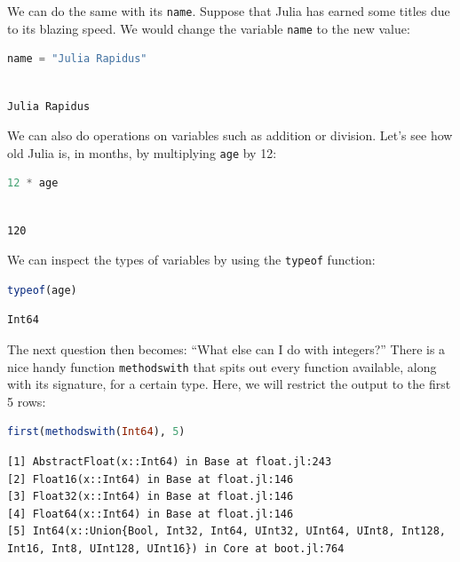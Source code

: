 \documentclass[
  notoc %
]{tufte-book}
\newcommand{\passthrough}[1]{#1}
\begin{document}
We can do the same with its \passthrough{\lstinline!name!}. Suppose that
Julia has earned some titles due to its blazing speed. We would change
the variable \passthrough{\lstinline!name!} to the new value:

\begin{lstlisting}[language=Julia]
name = "Julia Rapidus"
\end{lstlisting}

\begin{lstlisting}[language=Output]

Julia Rapidus

\end{lstlisting}

We can also do operations on variables such as addition or division.
Let's see how old Julia is, in months, by multiplying
\passthrough{\lstinline!age!} by 12:

\begin{lstlisting}[language=Julia]
12 * age
\end{lstlisting}

\begin{lstlisting}[language=Output]

120

\end{lstlisting}

We can inspect the types of variables by using the
\passthrough{\lstinline!typeof!} function:

\begin{lstlisting}[language=Julia]
typeof(age)
\end{lstlisting}

\begin{lstlisting}[language=Output]
Int64
\end{lstlisting}

The next question then becomes: ``What else can I do with integers?''
There is a nice handy function \passthrough{\lstinline!methodswith!}
that spits out every function available, along with its signature, for a
certain type. Here, we will restrict the output to the first 5 rows:

\begin{lstlisting}[language=Julia]
first(methodswith(Int64), 5)
\end{lstlisting}

\begin{lstlisting}[language=Output]
[1] AbstractFloat(x::Int64) in Base at float.jl:243
[2] Float16(x::Int64) in Base at float.jl:146
[3] Float32(x::Int64) in Base at float.jl:146
[4] Float64(x::Int64) in Base at float.jl:146
[5] Int64(x::Union{Bool, Int32, Int64, UInt32, UInt64, UInt8, Int128, Int16, Int8, UInt128, UInt16}) in Core at boot.jl:764
\end{lstlisting}
\end{document}
